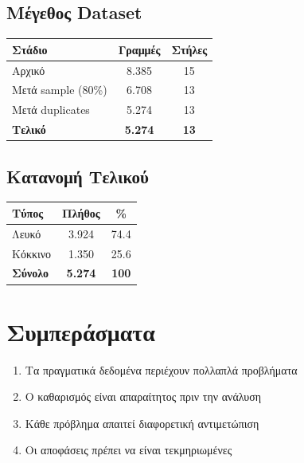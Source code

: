 \documentclass[12pt,a4paper]{article}
\begin{document}
\subsection{\textgreek{Μέγεθος Dataset}}

\begin{table}[H]
\centering
\begin{tabular}{lcc}
\toprule
\textbf{\textgreek{Στάδιο}} & \textbf{\textgreek{Γραμμές}} & \textbf{\textgreek{Στήλες}} \\
\midrule
\textgreek{Αρχικό} & 8.385 & 15 \\
\textgreek{Μετά sample (80\%)} & 6.708 & 13 \\
\textgreek{Μετά duplicates} & 5.274 & 13 \\
\textbf{\textgreek{Τελικό}} & \textbf{5.274} & \textbf{13} \\
\bottomrule
\end{tabular}
\end{table}

\subsection{\textgreek{Κατανομή Τελικού}}

\begin{table}[H]
\centering
\begin{tabular}{lcc}
\toprule
\textbf{\textgreek{Τύπος}} & \textbf{\textgreek{Πλήθος}} & \textbf{\%} \\
\midrule
\textgreek{Λευκό} & 3.924 & 74.4 \\
\textgreek{Κόκκινο} & 1.350 & 25.6 \\
\midrule
\textbf{\textgreek{Σύνολο}} & \textbf{5.274} & \textbf{100} \\
\bottomrule
\end{tabular}
\end{table}

\section{\textgreek{Συμπεράσματα}}

\begin{enumerate}
    \item \textgreek{Τα πραγματικά δεδομένα περιέχουν πολλαπλά προβλήματα}
    \item \textgreek{Ο καθαρισμός είναι απαραίτητος πριν την ανάλυση}
    \item \textgreek{Κάθε πρόβλημα απαιτεί διαφορετική αντιμετώπιση}
    \item \textgreek{Οι αποφάσεις πρέπει να είναι τεκμηριωμένες}
\end{enumerate}
\end{document}
